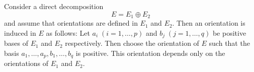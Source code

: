 Consider a direct decomposition
$$E = E_1 \oplus E_2$$
and assume that orientations are defined in $E_1$ and $E_2$. Then an orientation is induced in $E$ as follows: Let $a_i\;(i = 1, \ldots, p)$ and $b_j\;(j = 1, \ldots, q)$ be positive bases of $E_1$ and $E_2$ respectively. Then choose the orientation of $E$ such that the basis $a_1, \ldots, a_p, b_1, \ldots, b_q$ is positive. This orientation depends only on the orientations of $E_1$ and $E_2$.
